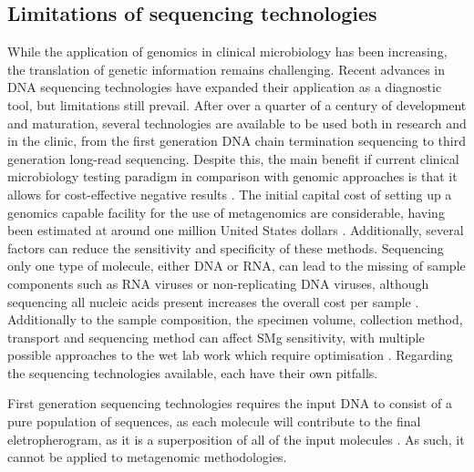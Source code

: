 \subsection{Limitations of sequencing technologies}

While the application of genomics in clinical microbiology has been increasing, the translation of genetic information remains challenging. Recent advances in DNA sequencing technologies have expanded their application as a diagnostic tool, but limitations still prevail. After over a quarter of a century of development and maturation, several technologies are available to be used both in research and in the clinic, from the first generation DNA chain termination sequencing to third generation long-read sequencing. Despite this, the main benefit if current clinical microbiology testing paradigm in comparison with genomic approaches is that it allows for cost-effective negative results \citep{greninger_challenge_2018}. The initial capital cost of setting up a genomics capable facility for the use of metagenomics are considerable, having been estimated at around one million United States dollars \citep{greninger_challenge_2018}. Additionally, several factors can reduce the sensitivity and specificity of these methods. Sequencing only one type of molecule, either \ac{DNA} or \ac{RNA}, can lead to the missing of sample components such as RNA viruses or non-replicating DNA viruses, although sequencing all nucleic acids present increases the overall cost per sample \citep{schuele_future_2021}. Additionally to the sample composition, the specimen volume, collection method, transport and sequencing method can affect \ac{SMg} sensitivity, with multiple possible approaches to the wet lab work which require optimisation \citep{petersen_third-generation_2019}. Regarding the sequencing technologies available, each have their own pitfalls. 

First generation sequencing technologies requires the input \ac{DNA} to consist of a pure population of sequences, as each molecule will contribute to the final eletropherogram, as it is a superposition of all of the input molecules \citep{hagemann_overview_2015}. As such, it cannot be applied to metagenomic methodologies.

